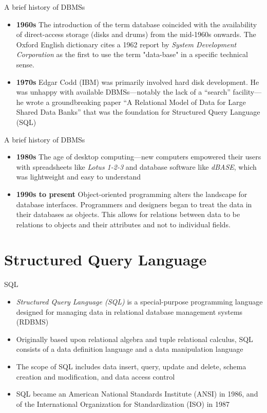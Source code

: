 \documentclass{beamer}
\begin{document}
\begin{frame}{A brief history of DBMSs}
\begin{itemize}
\item \textbf{1960s} The introduction of the term database coincided with the availability of direct-access storage (disks and drums) from the mid-1960s onwards. The Oxford English dictionary cites a 1962 report by \emph{System Development Corporation} as the first to use the term "data-base" in a specific technical sense.
\item \textbf{1970s} Edgar Codd (IBM) was primarily involved hard disk development. He was unhappy with available DBMSs---notably the lack of a ``search'' facility---he wrote a  groundbreaking paper ``A Relational Model of Data for Large Shared Data Banks'' that was the foundation for Structured Query Language (SQL)
\end{itemize} 
\end{frame}

\begin{frame}{A brief history of DBMSs}
\begin{itemize}
\item \textbf{1980s} The age of desktop computing---new computers empowered their users with spreadsheets like \emph{Lotus 1-2-3} and database software like \emph{dBASE}, which was lightweight and easy to understand
\item \textbf{1990s to present} Object-oriented programming alters the landscape for database interfaces. Programmers and designers began to treat the data in their databases as objects. This allows for relations between data to be relations to objects and their attributes and not to individual fields.
\end{itemize} 
\end{frame}

\section[]{Structured Query Language}
\begin{frame}{SQL}
\begin{itemize}
\item \emph{Structured Query Language (SQL)} is a special-purpose programming language designed for managing data in relational database management systems (RDBMS)
\item Originally based upon relational algebra and tuple relational calculus, SQL consists of a data definition language and a data manipulation language 
\item The scope of SQL includes data insert, query, update and delete, schema creation and modification, and data access control
\item SQL became an American National Standards Institute (ANSI) in 1986, and of the International Organization for Standardization (ISO) in 1987
\end{itemize}
\end{frame}
\end{document}
